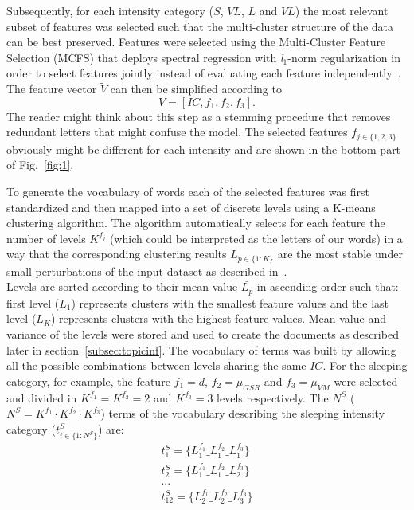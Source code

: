 Subsequently, for each intensity category ($S$, $VL$, $L$ and $VL$) the most relevant subset of features was selected such that the multi-cluster structure of the data can be best preserved. 
Features were selected using the Multi-Cluster Feature Selection (MCFS) that deploys spectral regression with \emph{l$_1$}-norm 
regularization in order to select features jointly instead of evaluating each feature independently~\cite{Cai_2010}. The feature vector $\tilde{V}$ can then be simplified according to
\begin{equation}
V = [IC, f_{1},f_{2},f_{3}].
\end{equation}
The reader might think about this step as a stemming procedure that removes redundant letters that might confuse the model.
The selected features $f_{j\in\{1,2,3\}}$ obviously might be different for each intensity and are shown in the bottom part of Fig.~\ref{fig:1}. 
\par To generate the vocabulary of words each of the selected features was first standardized and then mapped into a set of discrete levels using a K-means clustering algorithm. The algorithm automatically selects for each feature the number of levels $K^{f_{j}}$ (which could be interpreted as the letters of our words) in a way that the corresponding clustering results $L_{p\in\{1:K\}}$ are the most stable under small perturbations of the input dataset as described in~\cite{Luxburg_2010}.\\
Levels are sorted according to their mean value $\bar{L_{p}}$ in ascending order such that: first level ($L_{1}$) represents clusters with the smallest feature values and the last level ($L_{K}$) represents clusters with the highest feature values. 
Mean value and variance of the levels were stored and used to create the documents as described later in section~\ref{subsec:topicinf}. The vocabulary of terms was built by allowing all the possible combinations between levels sharing the same $IC$. 
For the sleeping category, for example, the feature $f_{1}=d$, $f_{2}=\mu_{GSR}$ and $f_{3}=\mu_{VM}$ were selected and divided in $K^{f_{1}}=K^{f_{2}}=2$ and $K^{f_{3}}=3$ levels respectively.
The $N^{S}$ ($N^{S}=K^{f_{1}} \cdot K^{f_{2}} \cdot K^{f_{3}}$) terms of the vocabulary describing the sleeping intensity category ($t^{S}_{i\in\{1:N^{S}\}}$) are:
\begin{eqnarray}\label{eq:words}
t^{S}_{1}=\{L_{1}^{f_{1}}\_L_{1}^{f_{2}}\_L_{1}^{f_{3}}\}\nonumber\\
t^{S}_{2}=\{L_{1}^{f_{1}}\_L_{1}^{f_{2}}\_L_{2}^{f_{3}}\}\nonumber\\
...\nonumber\\
t^{S}_{12}=\{L_{2}^{f_{1}}\_L_{2}^{f_{2}}\_L_{3}^{f_{3}}\}\nonumber\\
\end{eqnarray}

